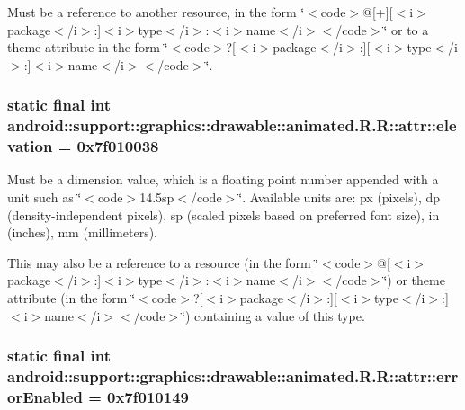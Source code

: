 Must be a reference to another resource, in the form \char`\"{}$<$code$>$@\mbox{[}+\mbox{]}\mbox{[}$<$i$>$package$<$/i$>$:\mbox{]}$<$i$>$type$<$/i$>$:$<$i$>$name$<$/i$>$$<$/code$>$\char`\"{} or to a theme attribute in the form \char`\"{}$<$code$>$?\mbox{[}$<$i$>$package$<$/i$>$:\mbox{]}\mbox{[}$<$i$>$type$<$/i$>$:\mbox{]}$<$i$>$name$<$/i$>$$<$/code$>$\char`\"{}. \hypertarget{classandroid_1_1support_1_1graphics_1_1drawable_1_1animated_1_1_r_1_1attr_5ba1cf089950800aa2f1630daa5e692a}{
\subsubsection[{elevation}]{\setlength{\rightskip}{0pt plus 5cm}static final int android::support::graphics::drawable::animated.R.R::attr::elevation = 0x7f010038}}
\label{classandroid_1_1support_1_1graphics_1_1drawable_1_1animated_1_1_r_1_1attr_5ba1cf089950800aa2f1630daa5e692a}


Must be a dimension value, which is a floating point number appended with a unit such as \char`\"{}$<$code$>$14.5sp$<$/code$>$\char`\"{}. Available units are: px (pixels), dp (density-independent pixels), sp (scaled pixels based on preferred font size), in (inches), mm (millimeters). 

This may also be a reference to a resource (in the form \char`\"{}$<$code$>$@\mbox{[}$<$i$>$package$<$/i$>$:\mbox{]}$<$i$>$type$<$/i$>$:$<$i$>$name$<$/i$>$$<$/code$>$\char`\"{}) or theme attribute (in the form \char`\"{}$<$code$>$?\mbox{[}$<$i$>$package$<$/i$>$:\mbox{]}\mbox{[}$<$i$>$type$<$/i$>$:\mbox{]}$<$i$>$name$<$/i$>$$<$/code$>$\char`\"{}) containing a value of this type. \hypertarget{classandroid_1_1support_1_1graphics_1_1drawable_1_1animated_1_1_r_1_1attr_d0e734934638377d1c8707a9531464db}{
\subsubsection[{errorEnabled}]{\setlength{\rightskip}{0pt plus 5cm}static final int android::support::graphics::drawable::animated.R.R::attr::errorEnabled = 0x7f010149}}
\label{classandroid_1_1support_1_1graphics_1_1drawable_1_1animated_1_1_r_1_1attr_d0e734934638377d1c8707a9531464db}


